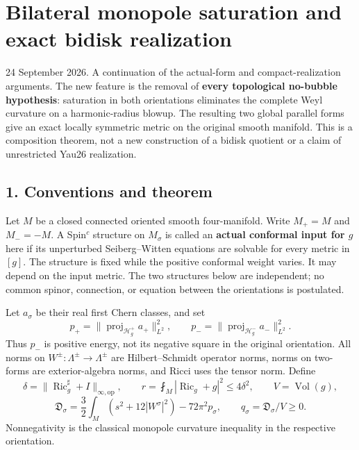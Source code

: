 \documentclass[
  11pt,
]{article}
\author{}
\date{}
\begin{document}
\hypertarget{bilateral-monopole-saturation-and-exact-bidisk-realization}{%
\section{Bilateral monopole saturation and exact bidisk
realization}\label{bilateral-monopole-saturation-and-exact-bidisk-realization}}

24 September 2026. A continuation of the actual-form and
compact-realization arguments. The new feature is the removal of
\textbf{every topological no-bubble hypothesis}: saturation in both
orientations eliminates the complete Weyl curvature on a harmonic-radius
blowup. The resulting two global parallel forms give an exact locally
symmetric metric on the original smooth manifold. This is a composition
theorem, not a new construction of a bidisk quotient or a claim of
unrestricted Yau26 realization.

\hypertarget{conventions-and-theorem}{%
\subsection{1. Conventions and theorem}\label{conventions-and-theorem}}

Let \(M\) be a closed connected oriented smooth four-manifold. Write
\(M_+=M\) and \(M_-=-M\). A Spin\(^c\) structure on \(M_\sigma\) is
called an \textbf{actual conformal input for \(g\)} here if its
unperturbed Seiberg--Witten equations are solvable for every metric in
\([g]\). The structure is fixed while the positive conformal weight
varies. It may depend on the input metric. The two structures below are
independent; no common spinor, connection, or equation between the
orientations is postulated.

Let \(a_\sigma\) be their real first Chern classes, and set \[
 p_+=\|\operatorname{proj}_{\mathcal H^+_g}a_+\|_{L^2}^2,
 \qquad
 p_-=\|\operatorname{proj}_{\mathcal H^-_g}a_-\|_{L^2}^2.
 \tag{1}
\] Thus \(p_-\) is positive energy, not its negative square in the
original orientation. All norms on \(W^\pm:\Lambda^\pm\to\Lambda^\pm\)
are Hilbert--Schmidt operator norms, norms on two-forms are
exterior-algebra norms, and Ricci uses the tensor norm. Define \[
 \delta=\|\operatorname{Ric}_g^\sharp+I\|_{\infty,\mathrm{op}},
 \qquad r=\fint_M|\operatorname{Ric}_g+g|^2\le4\delta^2,
 \qquad V=\operatorname{Vol}(g),
 \tag{2}
\] \[
 \mathfrak D_\sigma
 =\frac32\int_M(s^2+12|W^\sigma|^2)-72\pi^2p_\sigma,
 \qquad q_\sigma=\mathfrak D_\sigma/V\ge0.
 \tag{3}
\] Nonnegativity is the classical monopole curvature inequality in the
respective orientation.
\end{document}
